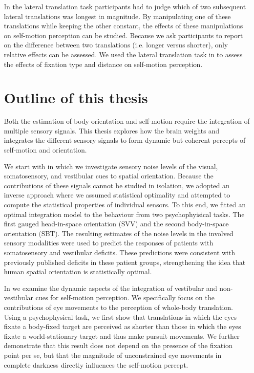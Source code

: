 In the lateral translation task participants had to judge which of two subsequent lateral translations was longest in magnitude. By manipulating one of these translations while keeping the other constant, the effects of these manipulations on self-motion perception can be studied. Because we ask participants to report on the difference between two translations (i.e. longer versus shorter), only relative effects can be assessed.  We used the lateral translation task in  to assess the effects of fixation type and distance on self-motion perception.


\section{Outline of this thesis}

Both the estimation of body orientation and self-motion require the integration of multiple sensory signals. This thesis explores how the brain weights and integrates the different sensory signals to form dynamic but coherent percepts of self-motion and orientation.

We start with  in which we investigate sensory noise levels of the visual, somatosensory, and vestibular cues to spatial orientation. Because the contributions of these signals cannot be studied in isolation, we adopted an inverse approach where we assumed statistical optimality and attempted to compute the statistical properties of individual sensors. To this end, we fitted an optimal integration model to the behaviour from two psychophyisical tasks. The first gauged head-in-space orientation (SVV) and the second body-in-space orientation (SBT). The resulting estimates of the noise levels in the involved sensory modalities were used to predict the responses of patients with somatosensory and vestibular deficits. These predictions were consistent with previously published deficits in these patient groups, strengthening the idea that human spatial orientation is statistically optimal.

In  we examine the dynamic aspects of the integration of vestibular and non-vestibular cues for self-motion perception. We specifically focus on the contributions of eye movements to the perception of whole-body translation. Using a psychophysical task, we first show that translations in which the eyes fixate a body-fixed target are perceived as shorter than those in which the eyes fixate a world-stationary target and thus make pursuit movements. We further demonstrate that this result does not depend on the presence of the fixation point per se, but that the magnitude of unconstrained eye movements in complete darkness directly influences the self-motion percept. 

